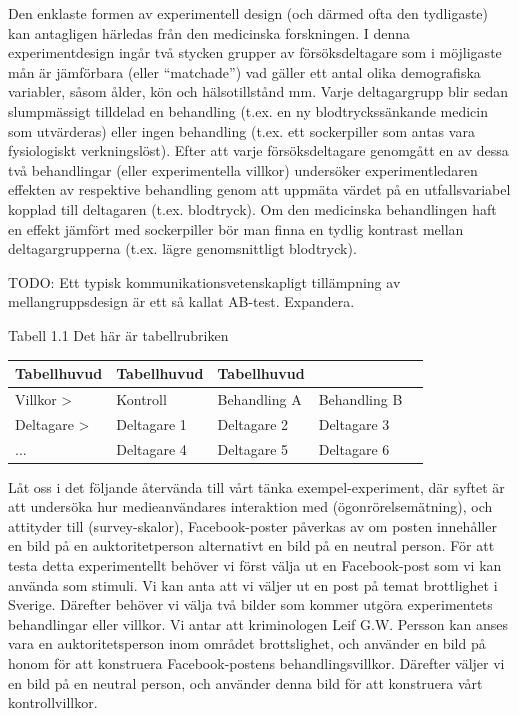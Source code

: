 \documentclass[
]{book}
\begin{document}
Den enklaste formen av experimentell design (och därmed ofta den tydligaste) kan antagligen härledas från den medicinska forskningen. I denna experimentdesign ingår två stycken grupper av försöksdeltagare som i möjligaste mån är jämförbara (eller ``matchade'') vad gäller ett antal olika demografiska variabler, såsom ålder, kön och hälsotillstånd mm. Varje deltagargrupp blir sedan slumpmässigt tilldelad en behandling (t.ex. en ny blodtryckssänkande medicin som utvärderas) eller ingen behandling (t.ex. ett sockerpiller som antas vara fysiologiskt verkningslöst). Efter att varje försöksdeltagare genomgått en av dessa två behandlingar (eller experimentella villkor) undersöker experimentledaren effekten av respektive behandling genom att uppmäta värdet på en utfallsvariabel kopplad till deltagaren (t.ex. blodtryck). Om den medicinska behandlingen haft en effekt jämfört med sockerpiller bör man finna en tydlig kontrast mellan deltagargrupperna (t.ex. lägre genomsnittligt blodtryck).

TODO: Ett typisk kommunikationsvetenskapligt tillämpning av mellangruppsdesign är ett så kallat AB-test. Expandera.

Tabell 1.1 Det här är tabellrubriken

\begin{longtable}[]{@{}lllll@{}}
\toprule
Tabellhuvud & Tabellhuvud & Tabellhuvud & &\tabularnewline
\midrule
\endhead
Villkor \textgreater{} & Kontroll & Behandling A & Behandling B &\tabularnewline
Deltagare \textgreater{} & Deltagare 1 & Deltagare 2 & Deltagare 3 &\tabularnewline
... & Deltagare 4 & Deltagare 5 & Deltagare 6 &\tabularnewline
\bottomrule
\end{longtable}

Låt oss i det följande återvända till vårt tänka exempel-experiment, där syftet är att undersöka hur medieanvändares interaktion med (ögonrörelsemätning), och attityder till (survey-skalor), Facebook-poster påverkas av om posten innehåller en bild på en auktoritetperson alternativt en bild på en neutral person. För att testa detta experimentellt behöver vi först välja ut en Facebook-post som vi kan använda som stimuli. Vi kan anta att vi väljer ut en post på temat brottlighet i Sverige. Därefter behöver vi välja två bilder som kommer utgöra experimentets behandlingar eller villkor. Vi antar att kriminologen Leif G.W. Persson kan anses vara en auktoritetsperson inom området brottslighet, och använder en bild på honom för att konstruera Facebook-postens behandlingsvillkor. Därefter väljer vi en bild på en neutral person, och använder denna bild för att konstruera vårt kontrollvillkor.
\end{document}
